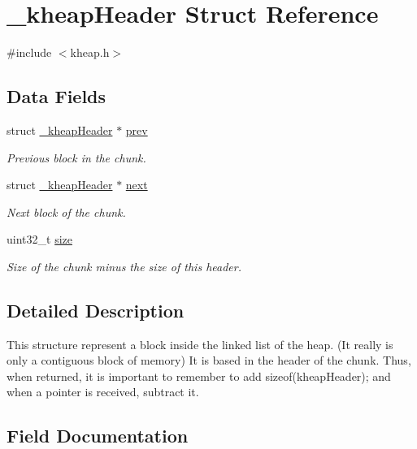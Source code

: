 \hypertarget{struct__kheapHeader}{}\section{\+\_\+kheap\+Header Struct Reference}
\label{struct__kheapHeader}


{\ttfamily \#include $<$kheap.\+h$>$}

\subsection*{Data Fields}
\begin{DoxyCompactItemize}
\item 
struct \hyperlink{struct__kheapHeader}{\+\_\+kheap\+Header} $\ast$ \hyperlink{struct__kheapHeader_a6755f9f330cfee6083f4f330af129608}{prev}
\begin{DoxyCompactList}\small\item\em Previous block in the chunk. \end{DoxyCompactList}\item 
struct \hyperlink{struct__kheapHeader}{\+\_\+kheap\+Header} $\ast$ \hyperlink{struct__kheapHeader_a6b7d743ff0a2e92dca939094312f9419}{next}
\begin{DoxyCompactList}\small\item\em Next block of the chunk. \end{DoxyCompactList}\item 
uint32\+\_\+t \hyperlink{struct__kheapHeader_aee2f50280223d62d19e3941897d08d23}{size}
\begin{DoxyCompactList}\small\item\em Size of the chunk minus the size of this header. \end{DoxyCompactList}\end{DoxyCompactItemize}


\subsection{Detailed Description}
This structure represent a block inside the linked list of the heap. (It really is only a contiguous block of memory) It is based in the header of the chunk. Thus, when returned, it is important to remember to add sizeof(kheap\+Header); and when a pointer is received, subtract it. 

\subsection{Field Documentation}
\mbox{\label{struct__kheapHeader_a6b7d743ff0a2e92dca939094312f9419}} 
